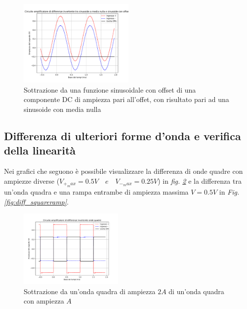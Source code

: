 \documentclass[journal]{IEEEtran}
\begin{document}
\begin{figure}[H]%
\begin {center}
\includegraphics[width=0.50\textwidth]{analysis/output/OPA_diff_sin3.pdf}
\caption{Sottrazione da una funzione sinusoidale con offset di una componente DC di ampiezza pari all'offet, con risultato pari ad una sinusoide con media nulla}
\label{fig:diff3}
\end {center}
\end{figure}

\subsection{\textbf{Differenza di ulteriori forme d'onda e verifica della linearità}}
Nei grafici che seguono è possibile visualizzare la differenza di onde quadre con ampiezze diverse ($V_{+_max} = 0.5V \quad e \quad V_{-_max} = 0.25V$) in \textit{fig. \ref{fig:diff_square}}
e la differenza tra un'onda quadra e una rampa entrambe di ampiezza massima $V=0.5V$ in \textit{Fig. \ref{fig:diff_squareramp}}.

\begin{figure}[H]%
\begin {center}
\includegraphics[width=0.45\textwidth]{analysis/output/OPA_diff_square.pdf}
\caption{Sottrazione da un'onda quadra di ampiezza $2A$ di un'onda quadra con ampiezza $A$}
\label{fig:diff_square}
\end {center}
\end{figure}
\end{document}
